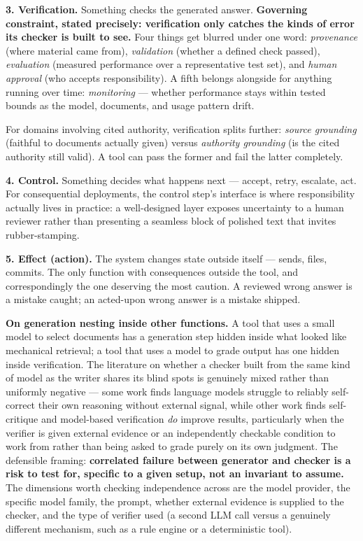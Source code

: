 \textbf{3. Verification.} Something checks the generated answer. \textbf{Governing constraint, stated precisely: verification only catches the kinds of error its checker is built to see.} Four things get blurred under one word: \emph{provenance} (where material came from), \emph{validation} (whether a defined check passed), \emph{evaluation} (measured performance over a representative test set), and \emph{human approval} (who accepts responsibility). A fifth belongs alongside for anything running over time: \emph{monitoring} --- whether performance stays within tested bounds as the model, documents, and usage pattern drift.

For domains involving cited authority, verification splits further: \emph{source grounding} (faithful to documents actually given) versus \emph{authority grounding} (is the cited authority still valid). A tool can pass the former and fail the latter completely.

\textbf{4. Control.} Something decides what happens next --- accept, retry, escalate, act. For consequential deployments, the control step's interface is where responsibility actually lives in practice: a well-designed layer exposes uncertainty to a human reviewer rather than presenting a seamless block of polished text that invites rubber-stamping.

\textbf{5. Effect (action).} The system changes state outside itself --- sends, files, commits. The only function with consequences outside the tool, and correspondingly the one deserving the most caution. A reviewed wrong answer is a mistake caught; an acted-upon wrong answer is a mistake shipped.

\textbf{On generation nesting inside other functions.} A tool that uses a small model to select documents has a generation step hidden inside what looked like mechanical retrieval; a tool that uses a model to grade output has one hidden inside verification. The literature on whether a checker built from the same kind of model as the writer shares its blind spots is genuinely mixed rather than uniformly negative --- some work finds language models struggle to reliably self-correct their own reasoning without external signal, while other work finds self-critique and model-based verification \emph{do} improve results, particularly when the verifier is given external evidence or an independently checkable condition to work from rather than being asked to grade purely on its own judgment. The defensible framing: \textbf{correlated failure between generator and checker is a risk to test for, specific to a given setup, not an invariant to assume.} The dimensions worth checking independence across are the model provider, the specific model family, the prompt, whether external evidence is supplied to the checker, and the type of verifier used (a second LLM call versus a genuinely different mechanism, such as a rule engine or a deterministic tool).

